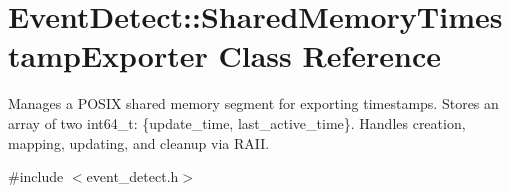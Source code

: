\hypertarget{classEventDetect_1_1SharedMemoryTimestampExporter}{}\section{Event\+Detect\+:\+:Shared\+Memory\+Timestamp\+Exporter Class Reference}
\label{classEventDetect_1_1SharedMemoryTimestampExporter}


Manages a P\+O\+S\+IX shared memory segment for exporting timestamps. Stores an array of two int64\+\_\+t\+: \{update\+\_\+time, last\+\_\+active\+\_\+time\}. Handles creation, mapping, updating, and cleanup via R\+A\+II.  




{\ttfamily \#include $<$event\+\_\+detect.\+h$>$}

